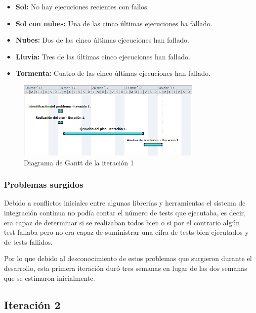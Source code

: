 \begin{itemize}
\item \textbf{Sol:} No hay ejecuciones recientes con fallos.
\item \textbf{Sol con nubes:} Una de las cinco últimas ejecuciones ha fallado.
\item \textbf{Nubes:} Dos de las cinco últimas ejecuciones han fallado.
\item \textbf{Lluvia:} Tres de las últimas cinco ejecuciones han fallado.
\item \textbf{Tormenta:} Cuatro de las cinco últimas ejecuciones han fallado.
\end{itemize}

\begin{figure}[!h]
\centering
   \includegraphics[width=9cm]{Diag-Gantt_It1.PNG}
\caption{Diagrama de Gantt de la iteración 1}
\end{figure}

\subsubsection{Problemas surgidos}

Debido a conflictos iniciales entre algunas librerías y herramientas el sistema de integración continua no podía contar el número de tests que ejecutaba, es decir, era capaz de determinar si se realizaban todos bien o si por el contrario algún test fallaba pero no era capaz de suministrar una cifra de tests bien ejecutados y de tests fallidos.

Por lo que debido al desconocimiento de estos problemas que surgieron durante el desarrollo, esta primera iteración duró tres semanas en lugar de las dos semanas que se estimaron inicialmente.


\subsection{Iteración 2}

